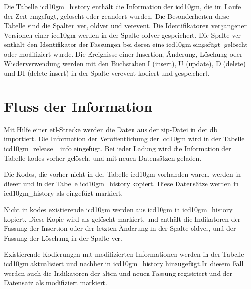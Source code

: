 Die Tabelle \glqq\textsf{icd10gm\_history}\grqq{} enthält die Information der \ac{icd10gm}, die im Laufe der Zeit eingefügt, gelöscht oder geändert wurden. Die Besonderheiten diese Tabelle sind die Spalten \glqq\textsf{ver}\grqq{}, \glqq\textsf{oldver}\grqq{} und \glqq\textsf{verevent}\grqq{}. Die Identifikatoren vergangener Versionen einer \ac{icd10gm} werden in der Spalte \glqq\textsf{oldver}\grqq{} gespeichert. Die Spalte \glqq\textsf{ver}\grqq{} enthält den Identifikator der Fassungen bei deren eine \ac{icd10gm} eingefügt, gelöscht oder modifiziert wurde. Die Ereignisse einer Insertion, Änderung, Löschung oder Wiederverwendung werden mit den Buchstaben \glqq\textsf{I}\grqq{} (insert), \glqq\textsf{U}\grqq{} (update), \glqq\textsf{D}\grqq{} (delete) und \glqq\textsf{DI}\grqq{} (delete insert) in der Spalte \glqq\textsf{verevent}\grqq{} kodiert und gespeichert.

\section{Fluss der Information} \label{sec:dbrun}

Mit Hilfe einer \ac{etl}-Strecke werden die Daten aus der \ac{zip}-Datei in der \ac{db} importiert. Die Information der Veröffentlichung der \ac{icd10gm} wird in der Tabelle \glqq\textsf{icd10gm\_release \_info}\grqq{} eingefügt. Bei jeder Ladung wird die Information der Tabelle \glqq\textsf{kodes}\grqq{} vorher gelöscht und mit neuen Datensätzen geladen. 

Die Kodes, die vorher nicht in der Tabelle \glqq\textsf{icd10gm}\grqq{} vorhanden waren, werden in dieser und in der Tabelle \glqq\textsf{icd10gm\_history}\grqq{} kopiert. Diese Datensätze werden in \glqq\textsf{icd10gm\_history}\grqq{} als eingefügt markiert. 

Nicht in \glqq\textsf{kodes}\grqq{} existierende \ac{icd10gm} werden aus \glqq\textsf{icd10gm}\grqq{} in \glqq\textsf{icd10gm\_history}\grqq{} kopiert. Diese Kopie wird als gelöscht markiert, und enthält die Indikatoren der Fassung der Insertion oder der letzten Änderung in der Spalte \textsf{oldver}\grqq{}, und der Fassung der Löschung in der Spalte \glqq\textsf{ver}\grqq{}. 

Existierende Kodierungen mit modifizierten Informationen werden in der Tabelle \glqq\textsf{icd10gm}\grqq{} aktualisiert und nachher in \glqq\textsf{icd10gm\_history}\grqq{} hinzugefügt.In diesem Fall werden auch die Indikatoren der alten und neuen Fassung registriert und der Datensatz als modifiziert markiert.

